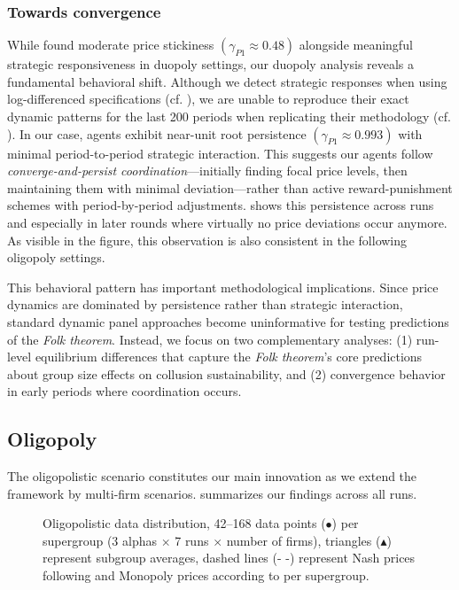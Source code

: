 
\subsubsection*{Towards convergence}

While \textcite[p. 18]{fish_algorithmic_2025} found moderate price stickiness $(\gamma_{P1} \approx 0.48)$ alongside meaningful strategic responsiveness in duopoly settings, our duopoly analysis reveals a fundamental behavioral shift. Although we detect strategic responses when using log-differenced specifications (cf. ), we are unable to reproduce their exact dynamic patterns for the last 200 periods when replicating their methodology (cf. ). In our case, agents exhibit near-unit root persistence $(\gamma_{P1} \approx 0.993)$ with minimal period-to-period strategic interaction. This suggests our agents follow \emph{converge-and-persist coordination}---initially finding focal price levels, then maintaining them with minimal deviation---rather than active reward-punishment schemes with period-by-period adjustments.  shows this persistence across runs and especially in later rounds where virtually no price deviations occur anymore. As visible in the figure, this observation is also consistent in the following oligopoly settings.

This behavioral pattern has important methodological implications. Since price dynamics are dominated by persistence rather than strategic interaction, standard dynamic panel approaches become uninformative for testing predictions of the \emph{Folk theorem}. Instead, we focus on two complementary analyses: (1) run-level equilibrium differences that capture the \emph{Folk theorem}'s core predictions about group size effects on collusion sustainability, and (2) convergence behavior in early periods where coordination occurs.


\subsection*{Oligopoly}

The oligopolistic scenario constitutes our main innovation as we extend the \textcite{fish_algorithmic_2025} framework by multi-firm scenarios.  summarizes our findings across all runs.

\begin{figure}[H]
    \centering
    
    \caption{Oligopolistic data distribution, 42--168 data points ($\bullet$) per supergroup (3 alphas $\times$ 7 runs $\times$ number of firms), triangles ($\blacktriangle$) represent subgroup averages, dashed lines ($\text{- -}$) represent Nash prices following  and Monopoly prices according to  per supergroup.}
    \label{fig:oligopols}
\end{figure}
